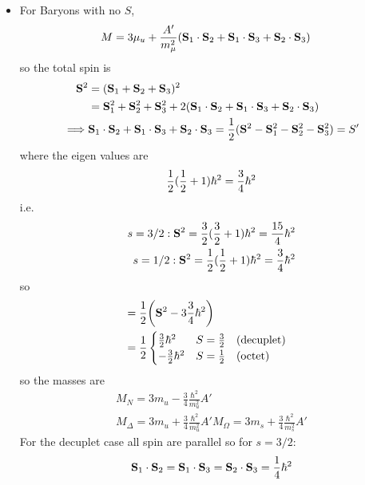 \documentclass[../main.tex]{subfiles}
\begin{document}
\begin{itemize}
    \item For Baryons with no $S$,
    \begin{align*}
        M &= 3\mu_u + \frac{A'}{m_\mu^2}(\vb S_1 \cdot \vb S_2 + \vb S_1 \cdot \vb S_3 + \vb S_2 \cdot \vb S_3)
    \end{align*}
    so the total spin is
    \begin{align*}
        \vb S^2 &= (\vb S_1 + \vb S_2 + \vb S_3)^2 \\
        &= \vb S_1^2 + \vb S_2^2 + \vb S_3^2 + 2(\vb S_1 \cdot \vb S_2 + \vb S_1 \cdot \vb S_3 + \vb S_2 \cdot \vb S_3) \\
        \implies & \vb S_1 \cdot \vb S_2 + \vb S_1 \cdot \vb S_3 + \vb S_2 \cdot \vb S_3 = \frac{1}{2} (\vb S^2 - \vb S_1^2 - \vb S_2^2 - \vb S_3^2) = S'
    \end{align*}
    where the eigen values are
    \begin{align*}
        \frac{1}{2} (\frac{1}{2} + 1) \hbar^2 = \frac{3}{4} \hbar^2
    \end{align*}
    i.e.
    \begin{align*}
        s = 3/2: \vb S^2 = \frac{3}{2} (\frac{3}{2} + 1) \hbar^2 = \frac{15}{4} \hbar^2 \\
        s = 1/2: \vb S^2 = \frac{1}{2} (\frac{1}{2} + 1) \hbar^2 = \frac{3}{4} \hbar^2
    \end{align*}
    so
    \begin{align*}
        &= \ohf \qt(\vb S^2 - 3 \frac{3}{4} \hbar^2) \\
        &= \ohf \begin{cases}
            \frac{3}{2} \hbar^2 & S = \frac{3}{2} \qqtext{(decuplet)} \\
            -\frac{3}{2} \hbar^2 & S = \frac{1}{2} \qqtext{(octet)}
        \end{cases}
    \end{align*}
    so the masses are
    \begin{align*}
        M_N = 3m_u - \frac{3}{4} \frac{\hbar^2}{m_u^2} A' \\
        M_\Delta = 3m_u + \frac{3}{4} \frac{\hbar^2}{m_u^2} A'
        M_\Omega = 3m_s + \frac{3}{4} \frac{\hbar^2}{m_s^2} A'
    \end{align*}
    For the decuplet case all spin are parallel so for $s = 3/2$:
    \begin{align*}
        \vb S_1 \cdot \vb S_2 = \vb S_1 \cdot \vb S_3 = \vb S_2 \cdot \vb S_3 = \frac{1}{4} \hbar^2
    \end{align*}

\end{itemize}
\end{document}
